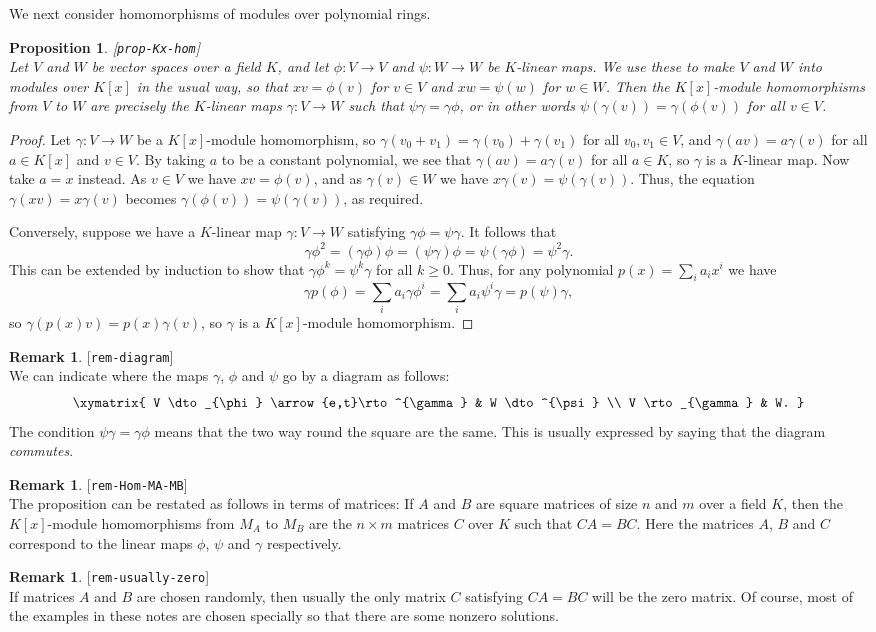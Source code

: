 \documentclass{amsart}
\newcommand{\lbl}[1]{\label{#1}\textup{[\texttt{#1}]}\ \\}
\newcommand{\lbl}{\label}
\newcommand{\gm}        {\gamma}
\newcommand{\tm}        {\times}
\newcommand{\xra}       {\xrightarrow}
\renewcommand{\:}{\colon}
\newtheorem{proposition}[theorem]{Proposition}
\theoremstyle{definition}
\newtheorem{remark}[theorem]{Remark}
\begin{document}
We next consider homomorphisms of modules over polynomial rings.
\begin{proposition}\lbl{prop-Kx-hom}
 Let $V$ and $W$ be vector spaces over a field $K$, and let
 $\phi\:V\xra{}V$ and $\psi\:W\xra{}W$ be $K$-linear maps.  We use
 these to make $V$ and $W$ into modules over $K[x]$ in the usual way,
 so that $xv=\phi(v)$ for $v\in V$ and $xw=\psi(w)$ for $w\in W$.
 Then the $K[x]$-module homomorphisms from $V$ to $W$ are precisely
 the $K$-linear maps $\gm\:V\xra{}W$ such that $\psi\gm=\gm\phi$, or
 in other words $\psi(\gm(v))=\gm(\phi(v))$ for all $v\in V$.
\end{proposition}
\begin{proof}
 Let $\gm\:V\xra{}W$ be a $K[x]$-module homomorphism, so
 $\gm(v_0+v_1)=\gm(v_0)+\gm(v_1)$ for all $v_0,v_1\in V$, and
 $\gm(av)=a\gm(v)$ for all $a\in K[x]$ and $v\in V$.  By taking $a$ to
 be a constant polynomial, we see that $\gm(av)=a\gm(v)$ for all
 $a\in K$, so $\gm$ is a $K$-linear map.  Now take $a=x$ instead.  As
 $v\in V$ we have $xv=\phi(v)$, and as $\gm(v)\in W$ we have
 $x\gm(v)=\psi(\gm(v))$.  Thus, the equation $\gm(xv)=x\gm(v)$ becomes
 $\gm(\phi(v))=\psi(\gm(v))$, as required.

 Conversely, suppose we have a $K$-linear map $\gm\:V\xra{}W$
 satisfying $\gm\phi=\psi\gm$.  It follows that 
 \[ \gm\phi^2=(\gm\phi)\phi=(\psi\gm)\phi=\psi(\gm\phi)=\psi^2\gm. \]
 This can be extended by induction to show that $\gm\phi^k=\psi^k\gm$
 for all $k\geq 0$.  Thus, for any polynomial $p(x)=\sum_ia_ix^i$ we
 have 
 \[ \gm p(\phi)=\sum_i a_i \gm\phi^i=\sum_ia_i\psi^i\gm=p(\psi)\gm, \]
 so $\gm(p(x)v)=p(x)\gm(v)$, so $\gm$ is a $K[x]$-module homomorphism.
\end{proof}
\begin{remark}\lbl{rem-diagram}
 We can indicate where the maps $\gm$, $\phi$ and $\psi$ go by a
 diagram as follows:
 \[ \xymatrix{
  V \dto_{\phi} \arrow{e,t}\rto^{\gm} &
  W \dto^{\psi} \\
  V \rto_{\gm} & W.
 } \]
 The condition $\psi\gm=\gm\phi$ means that the two way round the
 square are the same.  This is usually expressed by saying that the
 diagram \emph{commutes}.
\end{remark}
\begin{remark}\lbl{rem-Hom-MA-MB}
 The proposition can be restated as follows in terms of matrices: If
 $A$ and $B$ are square matrices of size $n$ and $m$ over a field $K$,
 then the $K[x]$-module homomorphisms from $M_A$ to $M_B$ are the
 $n\tm m$ matrices $C$ over $K$ such that $CA=BC$.  Here the matrices
 $A$, $B$ and $C$ correspond to the linear maps $\phi$, $\psi$ and
 $\gm$ respectively.
\end{remark}
\begin{remark}\lbl{rem-usually-zero}
 If matrices $A$ and $B$ are chosen randomly, then usually the only
 matrix $C$ satisfying $CA=BC$ will be the zero matrix.  Of course,
 most of the examples in these notes are chosen specially so that
 there are some nonzero solutions.
\end{remark}
\end{document}
